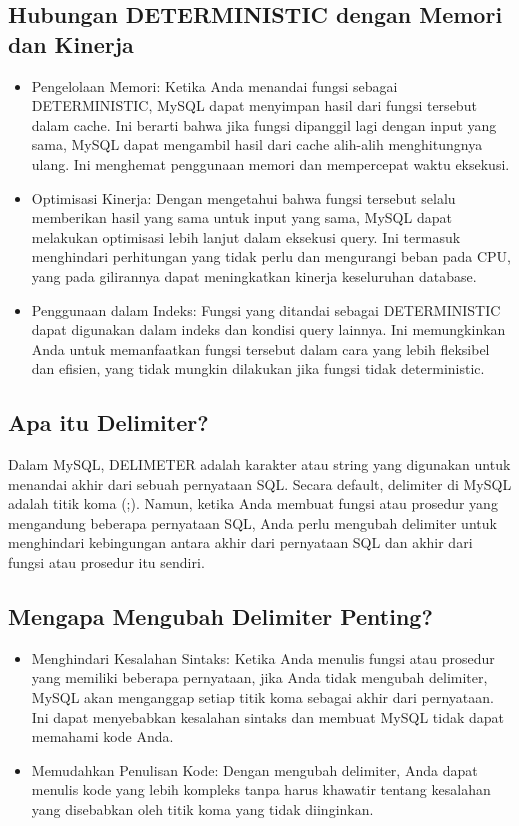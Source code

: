 \documentclass{article}
\begin{document}
\subsection{Hubungan DETERMINISTIC dengan Memori dan Kinerja}
\begin{itemize}
    \item Pengelolaan Memori: Ketika Anda menandai fungsi sebagai DETERMINISTIC, MySQL dapat menyimpan hasil dari fungsi tersebut dalam cache. Ini berarti bahwa jika fungsi dipanggil lagi dengan input yang sama, MySQL dapat mengambil hasil dari cache alih-alih menghitungnya ulang. Ini menghemat penggunaan memori dan mempercepat waktu eksekusi.
    \item Optimisasi Kinerja: Dengan mengetahui bahwa fungsi tersebut selalu memberikan hasil yang sama untuk input yang sama, MySQL dapat melakukan optimisasi lebih lanjut dalam eksekusi query. Ini termasuk menghindari perhitungan yang tidak perlu dan mengurangi beban pada CPU, yang pada gilirannya dapat meningkatkan kinerja keseluruhan database.
    \item Penggunaan dalam Indeks: Fungsi yang ditandai sebagai DETERMINISTIC dapat digunakan dalam indeks dan kondisi query lainnya. Ini memungkinkan Anda untuk memanfaatkan fungsi tersebut dalam cara yang lebih fleksibel dan efisien, yang tidak mungkin dilakukan jika fungsi tidak deterministic.
\end{itemize}

\subsection{Apa itu Delimiter?}
Dalam MySQL, DELIMETER adalah karakter atau string yang digunakan untuk menandai akhir dari sebuah pernyataan SQL. Secara default, delimiter di MySQL adalah titik koma (;). Namun, ketika Anda membuat fungsi atau prosedur yang mengandung beberapa pernyataan SQL, Anda perlu mengubah delimiter untuk menghindari kebingungan antara akhir dari pernyataan SQL dan akhir dari fungsi atau prosedur itu sendiri.

\subsection{Mengapa Mengubah Delimiter Penting?}
\begin{itemize}
    \item Menghindari Kesalahan Sintaks: Ketika Anda menulis fungsi atau prosedur yang memiliki beberapa pernyataan, jika Anda tidak mengubah delimiter, MySQL akan menganggap setiap titik koma sebagai akhir dari pernyataan. Ini dapat menyebabkan kesalahan sintaks dan membuat MySQL tidak dapat memahami kode Anda.
    \item Memudahkan Penulisan Kode: Dengan mengubah delimiter, Anda dapat menulis kode yang lebih kompleks tanpa harus khawatir tentang kesalahan yang disebabkan oleh titik koma yang tidak diinginkan.
\end{itemize}
\end{document}
